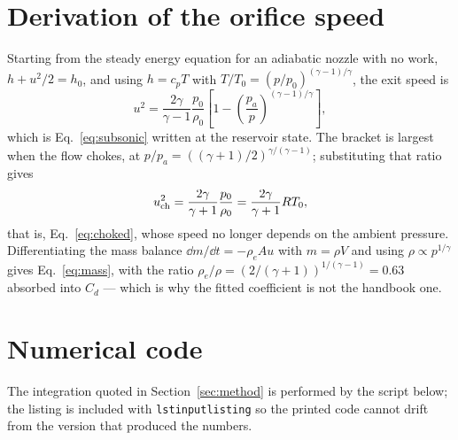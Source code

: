 \appendix

\section{Derivation of the orifice speed}
\label{app:derivation}

Starting from the steady energy equation for an adiabatic nozzle with no
work, $h+u^2/2=h_0$, and using $h=c_pT$ with
$T/T_0=(p/p_0)^{(\gamma-1)/\gamma}$, the exit speed is
\begin{equation}
  u^2 = \frac{2\gamma}{\gamma-1}\frac{p_0}{\rho_0}
  \left[1-\left(\frac{p_a}{p}\right)^{(\gamma-1)/\gamma}\right],
  \label{eq:app-derivation}
\end{equation}
which is Eq.~\eqref{eq:subsonic} written at the reservoir state. The
bracket is largest when the flow chokes, at
$p/p_a=((\gamma+1)/2)^{\gamma/(\gamma-1)}$; substituting that ratio gives
\begin{equation}
  u_{\rm ch}^2 = \frac{2\gamma}{\gamma+1}\frac{p_0}{\rho_0}
  = \frac{2\gamma}{\gamma+1}RT_0,
  \label{eq:app-choked}
\end{equation}
that is, Eq.~\eqref{eq:choked}, whose speed no longer depends on the
ambient pressure. Differentiating the mass balance
$\dd m/\dd t=-\rho_e A u$ with $m=\rho V$ and using
$\rho\propto p^{1/\gamma}$ gives Eq.~\eqref{eq:mass}, with the ratio
$\rho_e/\rho=(2/(\gamma+1))^{1/(\gamma-1)}=0.63$ absorbed into $C_d$ ---
which is why the fitted coefficient is not the handbook one.

\section{Numerical code}
\label{app:code}

The integration quoted in Section~\ref{sec:method} is performed by the
script below; the listing is included with \texttt{lstinputlisting} so the
printed code cannot drift from the version that produced the numbers.

